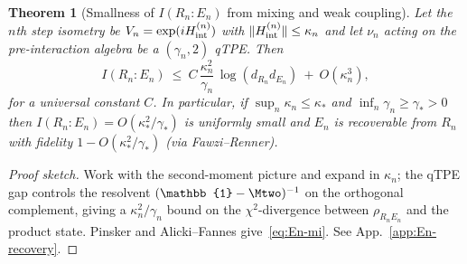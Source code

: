 \documentclass[aps,prd,preprint,onecolumn,superscriptaddress,nofootinbib,longbibliography,floatfix,11pt,showpacs,showkeys]{revtex4-2}
\theoremstyle{plain}
\newtheorem{theorem}{Theorem}
\theoremstyle{definition}
\theoremstyle{remark}
\begin{document}

\begin{theorem}[Smallness of $I(R_n{:}E_n)$ from mixing and weak coupling]\label{thm:En-mi}
Let the $n$th step isometry be $V_n=\exp(i H_{\rm int}^{(n)})$ with $\|H_{\rm int}^{(n)}\| \le \kappa_n$ and let $\nu_n$ acting on the pre-interaction algebra be a $(\gamma_n,2)$ qTPE. Then
\begin{equation}\label{eq:En-mi}
I(R_n{:}E_n)\ \le\ C\, \frac{\kappa_n^2}{\gamma_n}\,\log(d_{R_n}d_{E_n})\ +\ O(\kappa_n^3),
\end{equation}
for a universal constant $C$. In particular, if $\sup_n\kappa_n\le \kappa_*$ and $\inf_n\gamma_n\ge \gamma_*>0$ then $I(R_n{:}E_n)=O(\kappa_*^2/\gamma_*)$ is uniformly small and $E_n$ is recoverable from $R_n$ with fidelity $1-O(\kappa_*^2/\gamma_*)$ (via Fawzi--Renner).
\end{theorem}
\begin{proof}[Proof sketch]
Work with the second-moment picture and expand in $\kappa_n$; the qTPE gap controls the resolvent $(\mathbb{1}-\Mtwo)^{-1}$ on the orthogonal complement, giving a $\kappa_n^2/\gamma_n$ bound on the $\chi^2$-divergence between $\rho_{R_nE_n}$ and the product state. Pinsker and Alicki--Fannes give~\eqref{eq:En-mi}. See App.~\ref{app:En-recovery}.
\end{proof}
\end{document}
